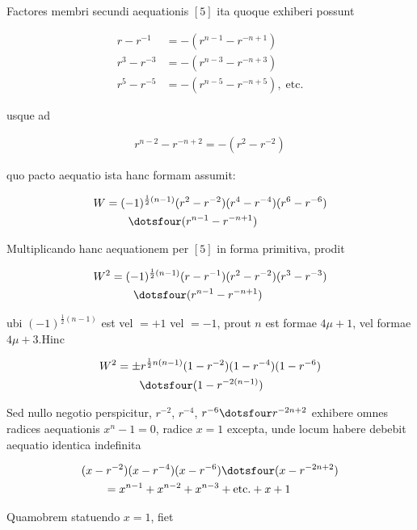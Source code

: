 
Factores membri secundi aequationis $[5]$ ita quoque exhiberi possunt

\[
\begin{aligned}
r-r^{-1}&=-(r^{n-1}-r^{-n+1})\\
r^3-r^{-3}&=-(r^{n-3}-r^{-n+3})\\
r^5-r^{-5}&=-(r^{n-5}-r^{-n+5}),\;\text{etc.}
\end{aligned}
\]

usque ad

\[
\begin{aligned}
r^{n-2}-r^{-n+2}=-(r^2-r^{-2})
\end{aligned}
\]

quo pacto aequatio ista hanc formam assumit:


\[
\begin{aligned}
W&=(-1)^{\frac12(n-1)}(r^2-r^{-2})(r^4-r^{-4})(r^6-r^{-6})\\&\qquad\dotsfour(r^{n-1}-r^{-n+1})
\end{aligned}
\]

Multiplicando hanc aequationem per $[5]$ in forma primitiva, prodit

\[
\begin{aligned}
W^2&=(-1)^{\frac12(n-1)}(r-r^{-1})(r^2-r^{-2})(r^3-r^{-3})\\&\qquad\dotsfour(r^{n-1}-r^{-n+1})
\end{aligned}
\]

ubi $(-1)^{\frac12(n-1)}$ est vel $=+1$ vel $=-1$, prout $n$ est formae $4\mu+1$, vel formae $4\mu+3$.\quad Hinc

\[
\begin{aligned}
W^2&=\pm r^{\frac12n(n-1)}(1-r^{-2})(1-r^{-4})(1-r^{-6})\\&\qquad\dotsfour(1-r^{-2(n-1)})
\end{aligned}
\]

Sed nullo negotio perspicitur, $r^{-2}$, $r^{-4}$, $r^{-6}\dotsfour r^{-2n+2}$ exhibere omnes radices aequationis $x^n-1=0$, radice $x=1$ excepta, unde locum habere debebit aequatio identica indefinita

\[
\begin{aligned}
&(x-r^{-2})(x-r^{-4})(x-r^{-6})\dotsfour(x-r^{-2n+2})\\&\qquad=x^{n-1}+x^{n-2}+x^{n-3}+\text{etc.}+x+1
\end{aligned}
\]

Quamobrem statuendo $x=1$, fiet

